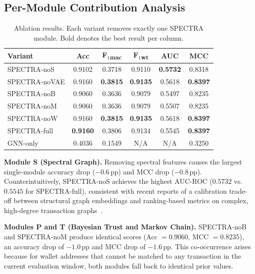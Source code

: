 \documentclass[journal]{IEEEtran}
\newcommand{\spectra}{\textsc{SPECTRA}}
\begin{document}
\subsection{Per-Module Contribution Analysis}
\label{subsec:ablation_modules}

\begin{table}[t]
  \centering
  \renewcommand{\arraystretch}{1.15}
  \caption{Ablation results. Each variant removes exactly one \spectra{} module.
           Bold denotes the best result per column.}
  \label{tab:ablation}
  \begin{tabular}{@{}lccccc@{}}
    \toprule
    \textbf{Variant}
      & \textbf{Acc}
      & \textbf{F$_1$\textsubscript{mac}}
      & \textbf{F$_1$\textsubscript{wt}}
      & \textbf{AUC}
      & \textbf{MCC} \\
    \midrule
    \spectra-noS   & 0.9102 & 0.3718 & 0.9110 & \textbf{0.5732} & 0.8318 \\
    \spectra-noVAE & 0.9160 & \textbf{0.3815} & \textbf{0.9135} & 0.5618 & \textbf{0.8397} \\
    \spectra-noB   & 0.9060 & 0.3636 & 0.9079 & 0.5497 & 0.8235 \\
    \spectra-noM   & 0.9060 & 0.3636 & 0.9079 & 0.5507 & 0.8235 \\
    \spectra-noW   & 0.9160 & \textbf{0.3815} & \textbf{0.9135} & 0.5618 & \textbf{0.8397} \\
    \midrule
    \spectra-full  & \textbf{0.9160} & 0.3806 & 0.9134 & 0.5545 & \textbf{0.8397} \\
    \midrule[\heavyrulewidth]
    GNN-only       & 0.4036 & 0.1549 & {N/A} & {N/A} & 0.3250 \\
    \bottomrule
  \end{tabular}
\end{table}

\noindent\textbf{Module S (Spectral Graph).}
Removing spectral features causes the largest single-module accuracy drop
($-0.6$\,pp) and MCC drop ($-0.8$\,pp).
Counterintuitively, \spectra-noS achieves the highest AUC-ROC ($0.5732$
vs.\ $0.5545$ for \spectra-full), consistent with recent reports of a
calibration trade-off between structural graph embeddings and ranking-based
metrics on complex, high-degree transaction graphs~\cite{Yao2024}.

\noindent\textbf{Modules P and T (Bayesian Trust and Markov Chain).}
\spectra-noB and \spectra-noM produce identical scores
(Acc $= 0.9060$, MCC $= 0.8235$), an accuracy drop of $-1.0$\,pp and
MCC drop of $-1.6$\,pp.  This co-occurrence arises because for wallet
addresses that cannot be matched to any transaction in the current evaluation
window, both modules fall back to identical prior values.
\end{document}
